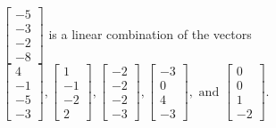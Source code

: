 \begin{exercise}
\begin{exerciseStatement}
  \end{exerciseStatement}
  \begin{exerciseAnswer}
   \(\left[\begin{array}{c}
-5 \\
-3 \\
-2 \\
-8
\end{array}\right]\) 
  	 is  
	a linear combination of the vectors \(\left[\begin{array}{c}
4 \\
-1 \\
-5 \\
-3
\end{array}\right] , \left[\begin{array}{c}
1 \\
-1 \\
-2 \\
2
\end{array}\right] , \left[\begin{array}{c}
-2 \\
-2 \\
-2 \\
-3
\end{array}\right] , \left[\begin{array}{c}
-3 \\
0 \\
4 \\
-3
\end{array}\right] , \text{ and } \left[\begin{array}{c}
0 \\
0 \\
1 \\
-2
\end{array}\right]\).

	
  


  \end{exerciseAnswer}
\end{exercise}